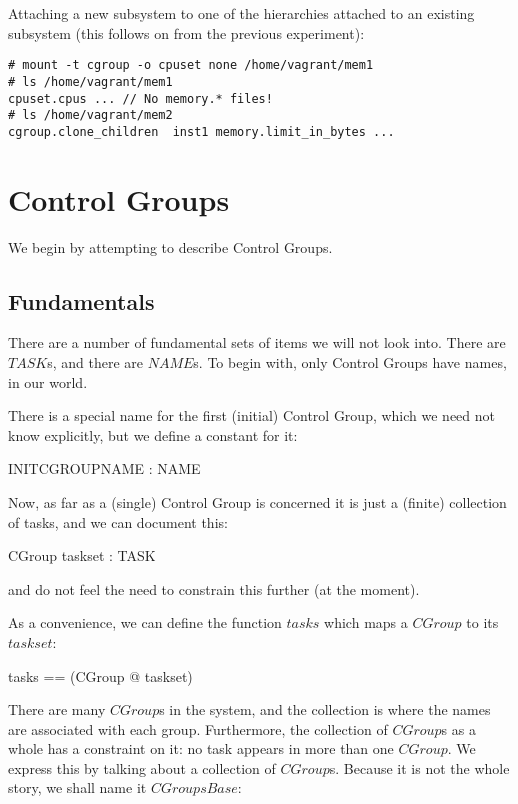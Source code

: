 \documentclass[a4paper,twoside,12pt]{article}
\begin{document}
Attaching a new subsystem to one of the hierarchies attached to an existing subsystem (this follows on from the previous experiment):
\begin{verbatim}
# mount -t cgroup -o cpuset none /home/vagrant/mem1
# ls /home/vagrant/mem1
cpuset.cpus ... // No memory.* files!
# ls /home/vagrant/mem2
cgroup.clone_children  inst1 memory.limit_in_bytes ...
\end{verbatim}

\section{Control Groups}

We begin by attempting to describe Control Groups.

\subsection{Fundamentals}
There are a number of fundamental sets of items we will not look into. There are $TASK$s, and there are $NAME$s. To begin with, only Control Groups have names, in our world.

\begin{zed}
\end{zed}

There is a special name for the first (initial) Control Group, which we need not know explicitly, but we define a constant for it:

\begin{axdef}{}
INITCGROUPNAME : NAME
\end{axdef}

Now, as far as a (single) Control Group is concerned it is just a (finite) collection of tasks, and we can document this:

\begin{schema}{CGroup}
taskset : \finset TASK
\end{schema}
and do not feel the need to constrain this further (at the moment).

As a convenience, we can define the function $tasks$ which maps a $CGroup$ to its $taskset$:
\begin{zed}
tasks == (\lambda CGroup @ taskset)
\end{zed}

There are many $CGroup$s in the system, and the collection is where the names are associated with each group. Furthermore, the collection of $CGroup$s as a whole has a constraint on it: no task appears in more than one $CGroup$. We express this by talking about a collection of $CGroup$s. Because it is not the whole story, we shall name it $CGroupsBase$:
\end{document}
